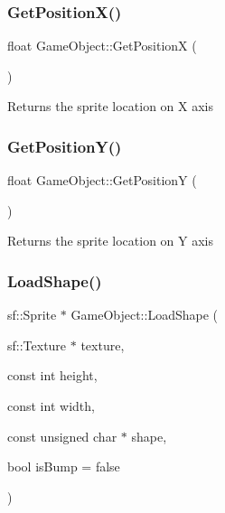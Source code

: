 \subsubsection{\texorpdfstring{Get\+Position\+X()}{GetPositionX()}}
{\footnotesize\ttfamily float Game\+Object\+::\+Get\+PositionX (\begin{DoxyParamCaption}{ }\end{DoxyParamCaption})\hspace{0.3cm}{\ttfamily [inline]}}

Returns the sprite location on X axis \mbox{\label{class_game_object_abe7e418773edb98562033fcfdf191dd9}} 
\subsubsection{\texorpdfstring{Get\+Position\+Y()}{GetPositionY()}}
{\footnotesize\ttfamily float Game\+Object\+::\+Get\+PositionY (\begin{DoxyParamCaption}{ }\end{DoxyParamCaption})\hspace{0.3cm}{\ttfamily [inline]}}

Returns the sprite location on Y axis \mbox{\label{class_game_object_ab570c73233f2e8eb9fb3c043b1a68c4c}} 
\subsubsection{\texorpdfstring{Load\+Shape()}{LoadShape()}}
{\footnotesize\ttfamily sf\+::\+Sprite $\ast$ Game\+Object\+::\+Load\+Shape (\begin{DoxyParamCaption}\item[{sf\+::\+Texture $\ast$}]{texture,  }\item[{const int}]{height,  }\item[{const int}]{width,  }\item[{const unsigned char $\ast$}]{shape,  }\item[{bool}]{is\+Bump = {\ttfamily false} }\end{DoxyParamCaption})\hspace{0.3cm}{\ttfamily [protected]}}



